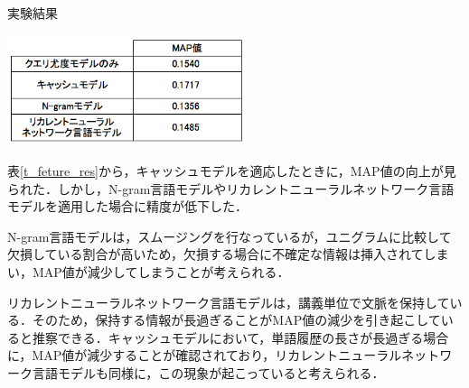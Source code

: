 \begin{table}[h]
    \centering
    \caption{実験結果}
    \includegraphics[width=7cm]{./image/t_feature2.png}
    \label{t_feture_res}
\end{table}

表\ref{t_feture_res}から，キャッシュモデルを適応したときに，MAP値の向上が見られた．しかし，N-gram言語モデルやリカレントニューラルネットワーク言語モデルを適用した場合に精度が低下した． 

N-gram言語モデルは，スムージングを行なっているが，ユニグラムに比較して欠損している割合が高いため，欠損する場合に不確定な情報は挿入されてしまい，MAP値が減少してしまうことが考えられる．

リカレントニューラルネットワーク言語モデルは，講義単位で文脈を保持している．そのため，保持する情報が長過ぎることがMAP値の減少を引き起こしていると推察できる．キャッシュモデルにおいて，単語履歴の長さが長過ぎる場合に，MAP値が減少することが確認されており，リカレントニューラルネットワーク言語モデルも同様に，この現象が起こっていると考えられる．